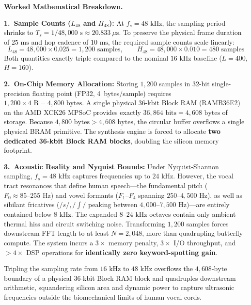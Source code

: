 \documentclass[11pt,a4paper]{article}
\begin{document}
\textbf{Worked Mathematical Breakdown.}

\textbf{1.~Sample Counts ($L_{48}$ and $H_{48}$):} At $f_s = 48\text{ kHz}$, the sampling period shrinks to $T_s = 1 / 48{,}000\text{ s} \approx 20.833\ \mu\text{s}$. To preserve the physical frame duration of $25\text{ ms}$ and hop cadence of $10\text{ ms}$, the required sample counts scale linearly:
\begin{equation}
  L_{48} = 48{,}000 \times 0.025 = 1{,}200\text{ samples}, \qquad H_{48} = 48{,}000 \times 0.010 = 480\text{ samples}
\end{equation}
Both quantities exactly triple compared to the nominal $16\text{ kHz}$ baseline ($L = 400$, $H = 160$).

\textbf{2.~On-Chip Memory Allocation:} Storing $1{,}200$ samples in 32-bit single-precision floating point (FP32, 4~bytes/sample) requires $1{,}200 \times 4\text{ B} = 4{,}800\text{ bytes}$. A single physical 36-kbit Block RAM (RAMB36E2) on the AMD XCK26 MPSoC provides exactly $36{,}864\text{ bits} = 4{,}608\text{ bytes}$ of storage. Because $4{,}800\text{ bytes} > 4{,}608\text{ bytes}$, the circular buffer overflows a single physical BRAM primitive. The synthesis engine is forced to allocate \textbf{two dedicated 36-kbit Block RAM blocks}, doubling the silicon memory footprint.

\textbf{3.~Acoustic Reality and Nyquist Bounds:} Under Nyquist-Shannon sampling, $f_s = 48\text{ kHz}$ captures frequencies up to $24\text{ kHz}$. However, the vocal tract resonances that define human speech---the fundamental pitch ($F_0 \approx 85\text{--}255\text{ Hz}$) and vowel formants ($F_1\text{--}F_4$ spanning $250\text{--}4{,}500\text{ Hz}$), as well as sibilant fricatives ($/s/, /\int/$ peaking between $4{,}000\text{--}7{,}500\text{ Hz}$)---are entirely contained below $8\text{ kHz}$. The expanded $8\text{--}24\text{ kHz}$ octaves contain only ambient thermal hiss and circuit switching noise. Transforming $1{,}200$ samples forces downstream FFT length to at least $N = 2{,}048$, more than quadrupling butterfly compute. The system incurs a $3\times$ memory penalty, $3\times$ I/O throughput, and $>4\times$ DSP operations for \textbf{identically zero keyword-spotting gain}.

\begin{physicalinsight}
Tripling the sampling rate from $16\text{ kHz}$ to $48\text{ kHz}$ overflows the $4{,}608\text{-byte}$ boundary of a physical 36-kbit Block RAM block and quadruples downstream arithmetic, squandering silicon area and dynamic power to capture ultrasonic frequencies outside the biomechanical limits of human vocal cords.
\end{physicalinsight}
\end{document}
